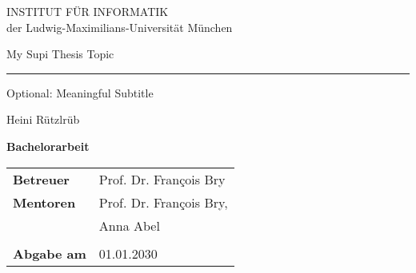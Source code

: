 \documentclass{book}
\newcommand{\thesisTitle}{My Supi Thesis Topic}
\newcommand{\thesisSubTitle}{Optional: Meaningful Subtitle}
\newcommand{\typeOfThesis}{Bachelorarbeit} %
\newcommand{\studentName}{Heini Rützlrüb}
\newcommand{\supervisor}{Prof. Dr. Fran\c{c}ois Bry} %
\newcommand{\advisor}{Anna Abel} %
\newcommand{\dateOfHandover}{01.01.2030}
\begin{document}
%
% 
\begin{titlepage}   
  \thispagestyle{empty} 
  \BgThispage
  \begin{adjustwidth}{3em}{3em} 
    \begin{center} 
        \vspace{5cm} 
        {\huge INSTITUT FÜR INFORMATIK\\} 
        {\Large der Ludwig-Maximilians-Universität München} 
    \end{center} 
    \vspace{2cm} 
    \begin{center} 
      \vspace*{15em} 
      \Huge \textsc \thesisTitle \\[.5em] \hrule \vspace*{.5em} 
      \huge \thesisSubTitle 
    \end{center} 
    \vspace*{2em} 
    \begin{center} 
      \huge \studentName 
    \end{center} 
    \vspace*{12em} 
    \begin{center} 
      \Large\textbf{\typeOfThesis}
    \end{center} 
    \vspace*{.5em} 
    \begin{center} 
      \begin{tabular}{ll} 
        \textbf{Betreuer} & \supervisor \\ 
        \textbf{Mentoren}        & \supervisor,\\
                                 & \advisor \\
                                 & \\
        \textbf{Abgabe am}       & \dateOfHandover                  
      \end{tabular} 
    \end{center} 
  \end{adjustwidth} 
  \cleardoublepage 
\end{titlepage} 










\end{document}
